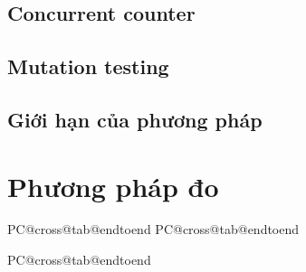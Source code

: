 \documentclass[a4paper]{article}
\makeatletter
\newif\ifshowtodo
\newcommand{\PCmissing}[1]{\ifshowtodo\par\medskip\noindent\fcolorbox{black!35}{black!4}{%
  \parbox{\dimexpr\linewidth-2\fboxsep-2\fboxrule}{\small\itshape\color{black!65}#1}}\par\medskip\fi}
\newcommand{\PCname}[1]{\texttt{\detokenize{#1}}}
\newcommand{\PCtable}[2]{%
  \ifcsname PC@#1@tab@#2\endcsname
    \begin{table}[H]\centering
      \caption{\csname PC@#1@tabcap@#2\endcsname}\label{tab:#1:#2}
      \csname PC@#1@tab@#2\endcsname
    \end{table}
  \else
    \PCmissing{Bảng \PCname{#2} của \PCname{#1} chưa có. Chạy \texttt{make bench} trên máy đó,
      chép \texttt{results/\detokenize{#1}/} về, rồi chạy \texttt{make figures}.}%
  \fi}
\newcommand{\PCtableopt}[2]{\ifcsname PC@#1@tab@#2\endcsname\PCtable{#1}{#2}\fi}
\makeatother
\begin{document}
\subsection{Concurrent counter}

\subsection{Mutation testing}

\subsection{Giới hạn của phương pháp}

\section{Phương pháp đo}

\PCtableopt{cross}{endtoend}
\end{document}
